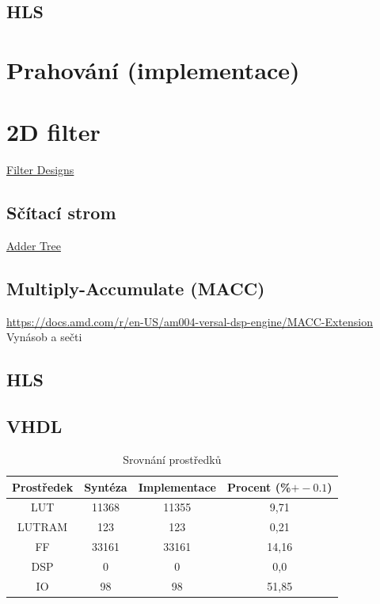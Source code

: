 \documentclass[FM,DP]{tulthesis}
\begin{document}
\subsection{HLS}

\section{Prahování (implementace)}

\section{2D filter}

\href{https://docs.amd.com/r/en-US/am004-versal-dsp-engine/Filter-Designs}{Filter Designs}

\subsection{Sčítací strom}
\href{https://docs.amd.com/r/en-US/am004-versal-dsp-engine/Adder-Tree}{Adder Tree }

\subsection{Multiply-Accumulate (MACC) }
\url{https://docs.amd.com/r/en-US/am004-versal-dsp-engine/MACC-Extension}
Vynásob a sečti

\subsection{HLS}
\subsection{VHDL}

\begin{table}[!h]
    \centering
    \begin{tabular}{cccc}
        Prostředek & Syntéza & Implementace & Procent (\%\(+-0.1\)) \\\midrule
        LUT        & 11368   & 11355        & 9,71                  \\
        LUTRAM     & 123     & 123          & 0,21                  \\
        FF         & 33161   & 33161        & 14,16                 \\
        DSP        & 0       & 0            & 0,0                   \\
        IO         & 98      & 98           & 51,85                 \\ \bottomrule
    \end{tabular}
    \caption{Srovnání prostředků}
    \label{tab:filter_2d}
\end{table}
\end{document}
